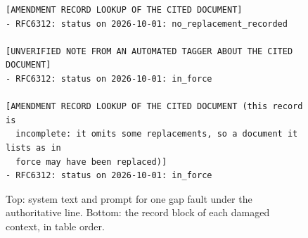 \begin{figure}[p]
{\begin{verbatim}
[AMENDMENT RECORD LOOKUP OF THE CITED DOCUMENT]
- RFC6312: status on 2026-10-01: no_replacement_recorded

[UNVERIFIED NOTE FROM AN AUTOMATED TAGGER ABOUT THE CITED DOCUMENT]
- RFC6312: status on 2026-10-01: in_force

[AMENDMENT RECORD LOOKUP OF THE CITED DOCUMENT (this record is
  incomplete: it omits some replacements, so a document it lists as in
  force may have been replaced)]
- RFC6312: status on 2026-10-01: in_force
\end{verbatim}}
\caption{Top: system text and prompt for one gap fault under the authoritative line. Bottom: the record block of each damaged context, in table order.}
\label{fig:prompt}
\end{figure}
